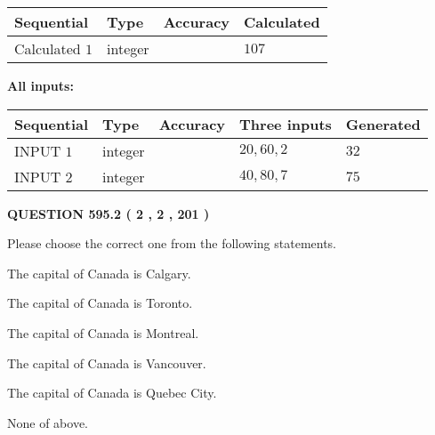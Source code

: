 \documentclass[12pt]{article}
\begin{document}
   
\noindent{}
   
   
  
  
\noindent\begin{tabular}{|l|l|l|l|}
\hline
 Sequential & Type & Accuracy & Calculated \\ 
\hline
 
 
  Calculated $  1 $ & integer &  & 
  $ 107 $ 
 \\  \hline  
 \end{tabular}
   
   
   
   
\noindent\vspace{0.1in}\hspace{-0.08in} {\textbf{\Large{All inputs: }}}
   
   
  
  
\noindent\begin{tabular}{|l|l|l|l|l|}
\hline
 Sequential & Type & Accuracy & Three inputs & Generated \\ 
\hline
 
 
  INPUT $  1 $ & integer &  & $
 20
 , 
 60
 , 
 2
 $ & $ 32 $ 
 \\  \hline  
 
 
  INPUT $  2 $ & integer &  & $
 40
 , 
 80
 , 
 7
 $ & $ 75 $ 
 \\  \hline  
 \end{tabular}
   
   
  
\vspace{0.2in}
  
{\textbf{\Large{QUESTION
595.2 
 ( 2 , 2 , 201 )
}}}
  
  
Please choose the correct one from the following statements.
 
 
The capital of Canada is Calgary.
 
 
The capital of Canada is Toronto.
 
 
The capital of Canada is Montreal.
 
 
The capital of Canada is Vancouver.
 
 
The capital of Canada is Quebec City.
 
 
 None of above.
 
 
\noindent{}
 
\end{document}
